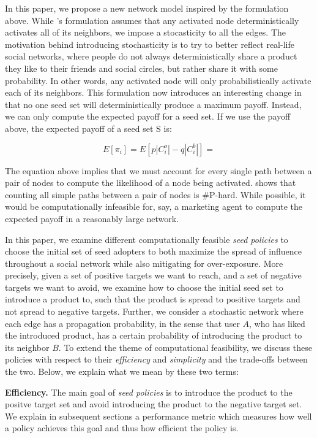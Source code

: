In this paper, we propose a new network model inspired by the formulation above. While \cite{Abebe}'s formulation assumes that any activated node deterministically activates all of its neighbors, we impose a stocasticity to all the edges. The motivation behind introducing stochasticity is to try to better reflect real-life social networks, where people do not always deterministically share a product they like to their friends and social circles, but rather share it with some probability. In other words, any activated node will only probabilistically activate each of its neighbors. This formulation now introduces an interesting change in that no one seed set will deterministically produce a maximum payoff. Instead, we can only compute the expected payoff for a seed set. If we use the payoff above, the expected payoff of a seed set S is:

\begin{equation}
E[\pi_i]=E[p|C_i^o| - q|C_i^b|]
=
\end{equation}

The equation above implies that we must account for every single path between a pair of nodes to compute the likelihood of a node being activated. \cite{Valiant} shows that counting all simple paths between a pair of nodes is \#P-hard. While possible, it would be computationally infeasible for, say, a marketing agent to compute the expected payoff in a reasonably large network.

In this paper, we examine different computationally feasible \textit{seed policies} to choose the initial set of seed adopters to both maximize the spread of influence throughout a social network while also mitigating for over-exposure. More precisely, given a set of positive targets we want to reach, and a set of negative targets we want to avoid, we examine how to choose the initial seed set to introduce a product to, such that the product is spread to positive targets and not spread to negative targets. Further, we consider a stochastic network where each edge has a propagation probability, in the sense that user $A$, who has liked the introduced product, has a certain probability of introducing the product to its neighbor $B$. To extend the theme of computational feasibility, we discuss these policies with respect to their \textit{efficiency} and \textit{simplicity} and the trade-offs between the two. Below, we explain what we mean by these two terms:

\noindent \textbf{Efficiency.} The main goal of \emph{seed policies} is to introduce the product to the positve target set and avoid introducing the product to the negative target set. We explain in subsequent sections a performance metric which measures how well a policy achieves this goal and thus how efficient the policy is.

